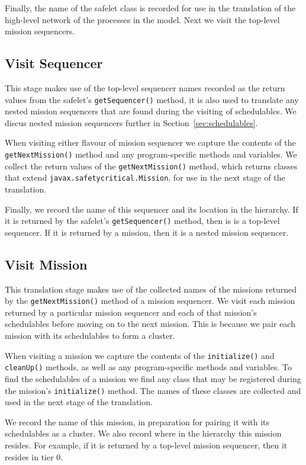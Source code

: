 \documentclass[10pt,a4paper]{article}
\begin{document}
Finally, the name of the safelet class is recorded for use in the translation of the high-level network of the processes in the model. Next we visit the top-level mission sequencers.

\subsection{Visit Sequencer}
\label{sec:sequencer}
This stage makes use of the top-level sequencer names recorded as the return values from the safelet's \texttt{getSequencer()} method, it is also used to translate any nested mission sequencers that are found during the visiting of schedulables. We discus nested mission sequencers further in Section~\ref{sec:schedulables}.

When visiting either flavour of mission sequencer we capture the contents of the \texttt{getNextMission()} method and any program-specific methods and variables. We collect the return values of the \texttt{getNextMission()} method, which returns classes that extend \texttt{javax.safetycritical.Mission}, for use in the next stage of the translation. 

Finally, we record the name of this sequencer and its location in the hierarchy. If it is returned by the safelet's \texttt{getSequencer()} method, then is is a top-level sequencer. If it is returned by a mission, then it is a nested mission sequencer. 

\subsection{Visit Mission}
\label{sec:mission}

This translation stage makes use of the collected names of the missions returned by the \texttt{getNextMission()} method of a mission sequencer. We visit each mission returned by a particular mission sequencer and each of that mission's schedulables before moving on to the next mission. This is because we pair each mission with its schedulables to form a cluster. 

When visiting a mission we capture the contents of the \texttt{initialize()} and \texttt{cleanUp()} methods, as well as any program-specific methods and variables. To find the schedulables of a mission we find any class that may be registered during the mission's \texttt{initialize()} method. The names of these classes are collected and used in the next stage of the translation. 

We record the name of this mission, in preparation for pairing it with its schedulables as a cluster. We also record where in the hierarchy this mission resides. For example, if it is returned by a top-level mission sequencer, then it resides in tier 0. 
\end{document}
